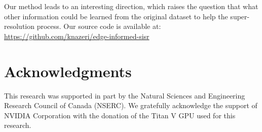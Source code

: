 \documentclass[10pt,twocolumn,letterpaper]{article}
\begin{document}
Our method leads to an interesting direction, which raises the question that what other information could be learned from the original dataset to help the super-resolution process. Our source code is available at:\\ {\footnotesize\url{https://github.com/knazeri/edge-informed-sisr}}
\section*{Acknowledgments} This research was supported in part by the Natural Sciences and Engineering Research Council of Canada (NSERC). We gratefully acknowledge the support of NVIDIA Corporation with the donation of the Titan V GPU used for this research.
\newpage


\end{document}

